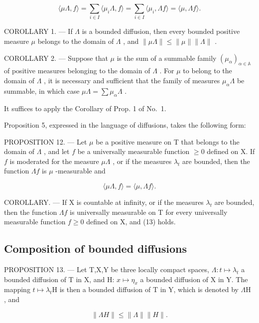 \[
\langle \mu \Lambda , f \rangle = \sum_ {i \in I} \langle \mu_ {i} \Lambda , f \rangle = \sum_ {i \in I} \langle \mu_ {i}, \Lambda f \rangle = \langle \mu , \Lambda f \rangle .
\]

COROLLARY 1. --- If \(\Lambda\) is a bounded diffusion, then every bounded positive measure \(\mu\) belongs to the domain of \(\Lambda\) , and \(\|\mu\Lambda\| \leqslant \|\mu\|\|\Lambda\|\) .

COROLLARY 2. --- Suppose that \(\mu\) is the sum of a summable family \((\mu_{\alpha})_{\alpha \in \mathbb{A}}\) of positive measures belonging to the domain of \(\Lambda\) . For \(\mu\) to belong to the domain of \(\Lambda\) , it is necessary and sufficient that the family of measures \(\mu_{\alpha}\Lambda\) be summable, in which case \(\mu \Lambda = \sum \mu_{\alpha}\Lambda\) .

It suffices to apply the Corollary of Prop. 1 of No.~1.

Proposition 5, expressed in the language of diffusions, takes the following form:

PROPOSITION 12. --- Let \(\mu\) be a positive measure on T that belongs to the domain of \(\Lambda\) , and let \(f\) be a universally measurable function \(\geqslant 0\) defined on X. If \(f\) is moderated for the measure \(\mu\Lambda\) , or if the measures \(\lambda_t\) are bounded, then the function \(\Lambda f\) is \(\mu\) -measurable and

\[
\langle \mu \Lambda , f \rangle = \langle \mu , \Lambda f \rangle .\tag{13}
\]

COROLLARY. --- If X is countable at infinity, or if the measures \(\lambda_{t}\) are bounded, then the function \(\Lambda f\) is universally measurable on T for every universally measurable function \(f \geqslant 0\) defined on X, and (13) holds.

\subsection{Composition of bounded diffusions}

PROPOSITION 13. --- Let T,X,Y be three locally compact spaces, \(\Lambda : t \mapsto \lambda_t\) a bounded diffusion of T in X, and H: \(x \mapsto \eta_x\) a bounded diffusion of X in Y. The mapping \(t \mapsto \lambda_t\mathrm{H}\) is then a bounded diffusion of T in Y, which is denoted by \(\Lambda\mathrm{H}\) , and

\[
\| \Lambda H \| \leqslant \| \Lambda \| \| H \|.\tag{14}
\]

